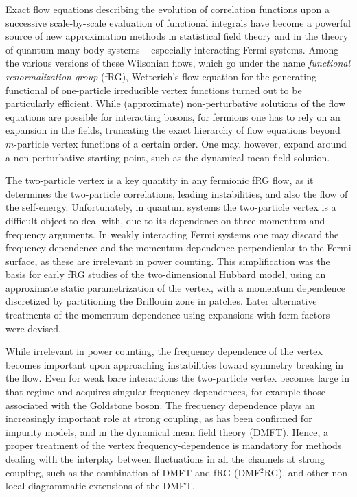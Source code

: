 Exact flow equations describing the evolution of correlation functions upon a successive scale-by-scale evaluation of functional integrals have become a powerful source of new approximation methods in statistical field theory \cite{Berges2002} and in the theory of quantum many-body systems -- especially interacting Fermi systems. \cite{Metzner2012} Among the various versions of these Wilsonian flows, which go under the name {\em functional renormalization group} (fRG), Wetterich's \cite{Wetterich1993} flow equation for the generating functional of one-particle irreducible vertex functions turned out to be particularly efficient. 
While (approximate) non-perturbative solutions of the flow equations are possible for interacting bosons, for fermions one has to rely on an expansion in the fields, truncating the exact hierarchy of flow equations beyond $m$-particle vertex functions of a certain order. One may, however, expand around a non-perturbative starting point, such as the dynamical mean-field solution. \cite{Taranto2014}

The two-particle vertex is a key quantity in any fermionic fRG flow, as it determines the two-particle correlations, leading instabilities, and also the flow of the self-energy. Unfortunately, in quantum systems the two-particle vertex is a difficult object to deal with, due to its dependence on three momentum and frequency arguments. In weakly interacting Fermi systems one may discard the frequency dependence and the momentum dependence perpendicular to the Fermi surface, as these are irrelevant in power counting. This simplification was the basis for early fRG studies of the two-dimensional Hubbard model, using an approximate static parametrization of the vertex, with a momentum dependence discretized by partitioning the Brillouin zone in patches. \cite{Zanchi1996,Halboth2000,Halboth2000b,Honerkamp2001}
Later alternative treatments of the momentum dependence using expansions with form factors were devised.\cite{Husemann2009,Eberlein2013,Eberlein2016}

While irrelevant in power counting, the frequency dependence of the vertex becomes important upon approaching instabilities toward symmetry breaking in the flow.\cite{Husemann2012} Even for weak bare interactions the two-particle vertex becomes large in that regime and acquires singular frequency dependences, for example those associated with the Goldstone boson.\cite{Eberlein2013}
The frequency dependence plays an increasingly important role at strong coupling, as has been confirmed for impurity models,\cite{Kinza2013,Wentzell2016a} and in the dynamical mean field theory (DMFT).\cite{Georges1996,Rohringer2012}
Hence, a proper treatment of the vertex frequency-dependence is mandatory for methods dealing with the interplay between fluctuations in all the channels at strong coupling, such as the combination of DMFT and fRG (DMF$^2$RG), \cite{Taranto2014} and other non-local diagrammatic extensions of the DMFT.\cite{Rohringer2017}

